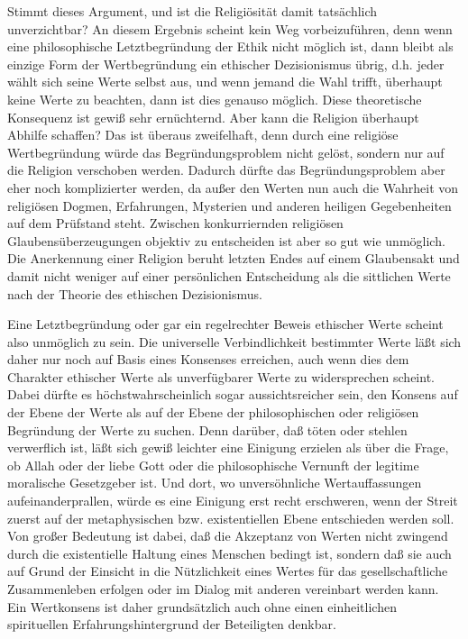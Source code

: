 Stimmt dieses Argument, und ist die Religiösität damit tatsächlich
unverzichtbar?  An diesem Ergebnis scheint kein Weg vorbeizuführen, denn wenn
eine philosophische Letztbegründung der Ethik nicht möglich ist, dann bleibt
als einzige Form der Wertbegründung ein ethischer Dezisionismus übrig, d.h.
jeder wählt sich seine Werte selbst aus, und wenn jemand die Wahl trifft,
überhaupt keine Werte zu beachten, dann ist dies genauso möglich. Diese
theoretische Konsequenz ist gewiß sehr ernüchternd. Aber kann die Religion
überhaupt Abhilfe schaffen? Das ist überaus zweifelhaft, denn durch eine
religiöse Wertbegründung würde das Begründungsproblem nicht gelöst, sondern
nur auf die Religion verschoben werden. Dadurch dürfte das Begründungsproblem
aber eher noch komplizierter werden, da außer den Werten nun auch die Wahrheit
von religiösen Dogmen, Erfahrungen, Mysterien und anderen heiligen
Gegebenheiten auf dem Prüfstand steht. Zwischen konkurriernden religiösen
Glaubensüberzeugungen objektiv zu entscheiden ist aber so gut wie unmöglich.
Die Anerkennung einer Religion beruht letzten Endes auf einem Glaubensakt und
damit nicht weniger auf einer persönlichen Entscheidung als die sittlichen
Werte nach der Theorie des ethischen Dezisionismus.

Eine Letztbegründung oder gar ein regelrechter Beweis ethischer Werte
scheint also unmöglich zu sein. Die universelle Verbindlichkeit
bestimmter Werte läßt sich daher nur noch auf Basis eines Konsenses
erreichen, auch wenn dies dem Charakter ethischer Werte als
unverfügbarer Werte zu widersprechen scheint.  Dabei dürfte es
höchstwahrscheinlich sogar aussichtsreicher sein, den Konsens auf der
Ebene der Werte als auf der Ebene der philosophischen oder religiösen
Begründung der Werte zu suchen. Denn darüber, daß töten oder stehlen
verwerflich ist, läßt sich gewiß leichter eine Einigung erzielen als
über die Frage, ob Allah oder der liebe Gott oder die philosophische
Vernunft der legitime moralische Gesetzgeber ist. Und dort, wo
unversöhnliche Wertauffassungen aufeinanderprallen, würde es eine
Einigung erst recht erschweren, wenn der Streit zuerst auf der
metaphysischen bzw. existentiellen Ebene entschieden werden soll. Von
großer Bedeutung ist dabei, daß die Akzeptanz von Werten nicht zwingend
durch die existentielle Haltung eines Menschen bedingt ist, sondern daß
sie auch auf Grund der Einsicht in die Nützlichkeit eines Wertes für das
gesellschaftliche Zusammenleben erfolgen oder im Dialog mit anderen
vereinbart werden kann. Ein Wertkonsens ist daher grundsätzlich auch
ohne einen einheitlichen spirituellen Erfahrungshintergrund der
Beteiligten denkbar.

